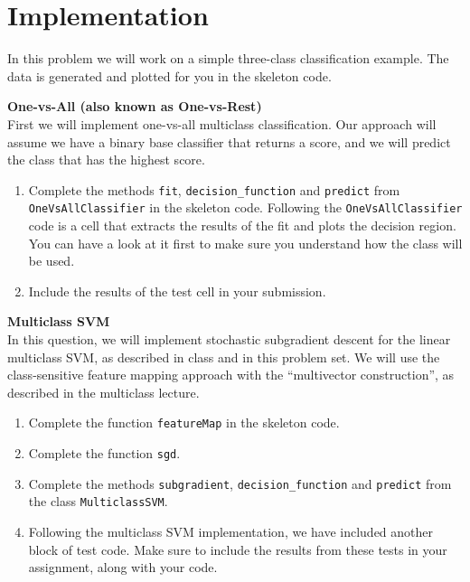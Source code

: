 \documentclass{article}
\newcommand{\nyuparagraph}[1]{\vspace{0.3cm}\textcolor{nyupurple}{\bf \large #1}\\}
\theoremstyle{plain}
\theoremstyle{definition}
\begin{document}
\section{Implementation}

In this problem we will work on a simple three-class classification
example.
The data is generated and plotted for you in the skeleton code. 

\nyuparagraph{One-vs-All (also known as One-vs-Rest)}

First we will implement one-vs-all multiclass classification.
Our approach will assume we have a binary base classifier that returns
a score, and we will predict the class that has the highest score. 
\begin{enumerate}
  \setcounter{enumi}{\value{saveenum}}
\item Complete the methods \texttt{fit}, \texttt{decision\_function} and \texttt{predict} from \texttt{OneVsAllClassifier}  in the skeleton code. Following
the \texttt{OneVsAllClassifier} code is a cell that extracts the results of
the fit and plots the decision region. You can have a look at it first to make sure you understand how the class will be used.
\item  Include the results of the test cell in your submission.
\setcounter{saveenum}{\value{enumi}}
\end{enumerate}


\nyuparagraph{Multiclass SVM}

In this question, we will implement stochastic subgradient descent
for the linear multiclass SVM, as described in class and in this
problem set. We will use the class-sensitive feature mapping approach
with the ``multivector construction'', as described in the multiclass lecture.
\begin{enumerate}
  \setcounter{enumi}{\value{saveenum}}
\item Complete the function \texttt{featureMap} in the skeleton code.
\item Complete the function \texttt{sgd}.
\item Complete the methods \texttt{subgradient}, \texttt{decision\_function} and \texttt{predict} from the class \texttt{MulticlassSVM}. 
\item Following the multiclass
SVM implementation, we have included another block of test code. Make
sure to include the results from these tests in your assignment, along
with your code. 
\setcounter{saveenum}{\value{enumi}}
\end{enumerate}
\end{document}
